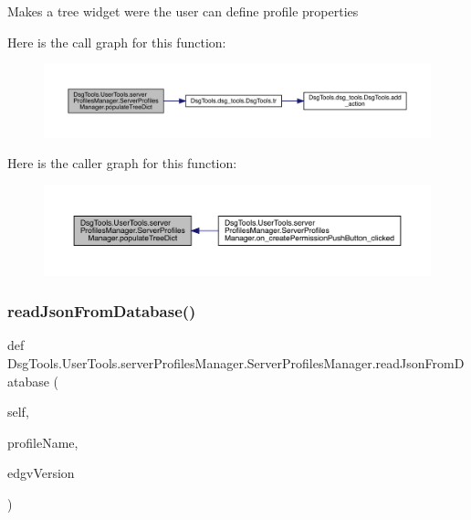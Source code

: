 \begin{DoxyVerb}Makes a tree widget were the user can define profile properties
\end{DoxyVerb}
 Here is the call graph for this function\+:
\nopagebreak
\begin{figure}[H]
\begin{center}
\leavevmode
\includegraphics[width=350pt]{class_dsg_tools_1_1_user_tools_1_1server_profiles_manager_1_1_server_profiles_manager_a7f949bfd945cb37076a785e7d4292b88_cgraph}
\end{center}
\end{figure}
Here is the caller graph for this function\+:
\nopagebreak
\begin{figure}[H]
\begin{center}
\leavevmode
\includegraphics[width=350pt]{class_dsg_tools_1_1_user_tools_1_1server_profiles_manager_1_1_server_profiles_manager_a7f949bfd945cb37076a785e7d4292b88_icgraph}
\end{center}
\end{figure}
\mbox{\label{class_dsg_tools_1_1_user_tools_1_1server_profiles_manager_1_1_server_profiles_manager_a55aa853f110f1aa87039275c0380d8d7}} 
\subsubsection{\texorpdfstring{read\+Json\+From\+Database()}{readJsonFromDatabase()}}
{\footnotesize\ttfamily def Dsg\+Tools.\+User\+Tools.\+server\+Profiles\+Manager.\+Server\+Profiles\+Manager.\+read\+Json\+From\+Database (\begin{DoxyParamCaption}\item[{}]{self,  }\item[{}]{profile\+Name,  }\item[{}]{edgv\+Version }\end{DoxyParamCaption})}

